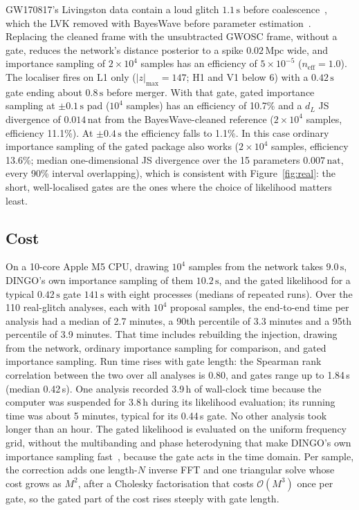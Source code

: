 \documentclass{openjournal}
\newcommand{\dL}{d_L}
\newcommand{\neff}{n_{\mathrm{eff}}}
\newcommand{\HARDWARE}{a 10-core Apple M5 CPU}
\newcommand{\RTmedianMin}{2.7}
\newcommand{\RTpninetyMin}{3.3}
\newcommand{\RTpninetyfiveMin}{3.9}
\newcommand{\RTmaxH}{3.9}
\newcommand{\RTslowGate}{0.44}
\newcommand{\RTlongestGate}{1.84}
\newcommand{\RTmedianGate}{0.42}
\newcommand{\RTspearman}{0.80}
\begin{document}
GW170817's Livingston data contain a loud glitch $1.1\,\mathrm{s}$ before coalescence~\cite{Abbott2017gw170817}, which the LVK removed with BayesWave before parameter estimation~\cite{Abbott2017gw170817,Pankow2018mitigation}.
Replacing the cleaned frame with the unsubtracted GWOSC frame, without a gate, reduces the network's distance posterior to a spike $0.02\,\mathrm{Mpc}$ wide, and importance sampling of $2\times10^{4}$ samples has an efficiency of $5\times10^{-5}$ ($\neff=1.0$).
The localiser fires on L1 only ($|z|_{\max}=147$; H1 and V1 below 6) with a $0.42\,\mathrm{s}$ gate ending about $0.8\,\mathrm{s}$ before merger.
With that gate, gated importance sampling at $\pm0.1\,\mathrm{s}$ pad ($10^{4}$ samples) has an efficiency of 10.7\% and a $\dL$ JS divergence of $0.014\,\mathrm{nat}$ from the BayesWave-cleaned reference ($2\times10^{4}$ samples, efficiency 11.1\%).
At $\pm0.4\,\mathrm{s}$ the efficiency falls to 1.1\%.
In this case ordinary importance sampling of the gated package also works ($2\times10^{4}$ samples, efficiency 13.6\%; median one-dimensional JS divergence over the 15 parameters $0.007\,\mathrm{nat}$, every 90\% interval overlapping), which is consistent with Figure~\ref{fig:real}: the short, well-localised gates are the ones where the choice of likelihood matters least.

\subsection{Cost}
\label{sec:cost}

On \HARDWARE{}, drawing $10^{4}$ samples from the network takes $9.0\,\mathrm{s}$, DINGO's own importance sampling of them $10.2\,\mathrm{s}$, and the gated likelihood for a typical $0.42\,\mathrm{s}$ gate $141\,\mathrm{s}$ with eight processes (medians of repeated runs).
Over the 110 real-glitch analyses, each with $10^{4}$ proposal samples, the end-to-end time per analysis had a median of \RTmedianMin{} minutes, a 90th percentile of \RTpninetyMin{} minutes and a 95th percentile of \RTpninetyfiveMin{} minutes.
That time includes rebuilding the injection, drawing from the network, ordinary importance sampling for comparison, and gated importance sampling.
Run time rises with gate length: the Spearman rank correlation between the two over all analyses is \RTspearman, and gates range up to \RTlongestGate{}\,s (median \RTmedianGate{}\,s).
One analysis recorded \RTmaxH{}\,h of wall-clock time because the computer was suspended for 3.8\,h during its likelihood evaluation; its running time was about 5 minutes, typical for its \RTslowGate{}\,s gate.
No other analysis took longer than an hour.
The gated likelihood is evaluated on the uniform frequency grid, without the multibanding and phase heterodyning that make DINGO's own importance sampling fast~\cite{Dax2025bns}, because the gate acts in the time domain.
Per sample, the correction adds one length-$N$ inverse FFT and one triangular solve whose cost grows as $M^2$, after a Cholesky factorisation that costs $\mathcal{O}(M^3)$ once per gate, so the gated part of the cost rises steeply with gate length.
\end{document}
